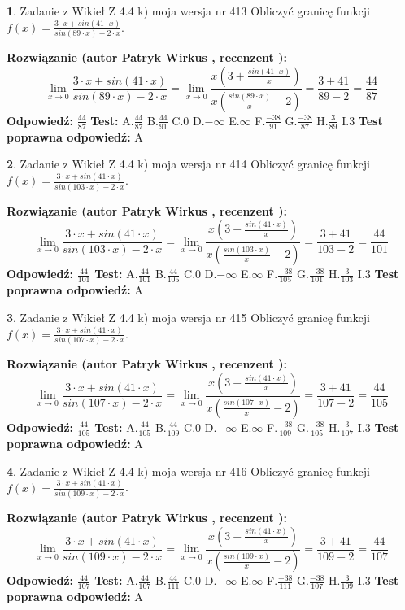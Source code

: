 \documentclass[12pt, a4paper]{article}
\theoremstyle{definition} %
\newtheorem{zad}{}
\newcommand{\zadStart}[1]{\begin{zad}#1\newline}
\newcommand{\zadStop}{\end{zad}}
\newcommand{\rozwStart}[2]{\noindent \textbf{Rozwiązanie (autor #1 , recenzent #2): }\newline}
\newcommand{\rozwStop}{\newline}
\newcommand{\odpStart}{\noindent \textbf{Odpowiedź:}\newline}
\newcommand{\odpStop}{\newline}
\newcommand{\testStart}{\noindent \textbf{Test:}\newline}
\newcommand{\testStop}{\newline}
\newcommand{\kluczStart}{\noindent \textbf{Test poprawna odpowiedź:}\newline}
\newcommand{\kluczStop}{\newline}
\begin{document}
\zadStart{Zadanie z Wikieł Z 4.4 k) moja wersja nr 413}
Obliczyć granicę funkcji $f(x)=\frac{3\cdot x +sin(41\cdot x)}{sin(89\cdot x) -2\cdot x}$.
\zadStop
\rozwStart{Patryk Wirkus}{}
$$\lim\limits_{x\to 0}\frac{3\cdot x +sin(41\cdot x)}{sin(89\cdot x) -2\cdot x}
=\lim\limits_{x\to 0}\frac{x(3+\frac{sin(41\cdot x)}{x})}{x(\frac{sin(89\cdot x)}{x}-2)}
=\frac{3+41}{89-2} = \frac{44}{87}$$
\rozwStop
\odpStart
$\frac{44}{87}$
\odpStop
\testStart
A.$\frac{44}{87}$
B.$\frac{44}{91}$
C.$0$
D.$-\infty$
E.$\infty$
F.$\frac{-38}{91}$
G.$\frac{-38}{87}$
H.$\frac{3}{89}$
I.$3$
\testStop
\kluczStart
A
\kluczStop



\zadStart{Zadanie z Wikieł Z 4.4 k) moja wersja nr 414}
Obliczyć granicę funkcji $f(x)=\frac{3\cdot x +sin(41\cdot x)}{sin(103\cdot x) -2\cdot x}$.
\zadStop
\rozwStart{Patryk Wirkus}{}
$$\lim\limits_{x\to 0}\frac{3\cdot x +sin(41\cdot x)}{sin(103\cdot x) -2\cdot x}
=\lim\limits_{x\to 0}\frac{x(3+\frac{sin(41\cdot x)}{x})}{x(\frac{sin(103\cdot x)}{x}-2)}
=\frac{3+41}{103-2} = \frac{44}{101}$$
\rozwStop
\odpStart
$\frac{44}{101}$
\odpStop
\testStart
A.$\frac{44}{101}$
B.$\frac{44}{105}$
C.$0$
D.$-\infty$
E.$\infty$
F.$\frac{-38}{105}$
G.$\frac{-38}{101}$
H.$\frac{3}{103}$
I.$3$
\testStop
\kluczStart
A
\kluczStop



\zadStart{Zadanie z Wikieł Z 4.4 k) moja wersja nr 415}
Obliczyć granicę funkcji $f(x)=\frac{3\cdot x +sin(41\cdot x)}{sin(107\cdot x) -2\cdot x}$.
\zadStop
\rozwStart{Patryk Wirkus}{}
$$\lim\limits_{x\to 0}\frac{3\cdot x +sin(41\cdot x)}{sin(107\cdot x) -2\cdot x}
=\lim\limits_{x\to 0}\frac{x(3+\frac{sin(41\cdot x)}{x})}{x(\frac{sin(107\cdot x)}{x}-2)}
=\frac{3+41}{107-2} = \frac{44}{105}$$
\rozwStop
\odpStart
$\frac{44}{105}$
\odpStop
\testStart
A.$\frac{44}{105}$
B.$\frac{44}{109}$
C.$0$
D.$-\infty$
E.$\infty$
F.$\frac{-38}{109}$
G.$\frac{-38}{105}$
H.$\frac{3}{107}$
I.$3$
\testStop
\kluczStart
A
\kluczStop



\zadStart{Zadanie z Wikieł Z 4.4 k) moja wersja nr 416}
Obliczyć granicę funkcji $f(x)=\frac{3\cdot x +sin(41\cdot x)}{sin(109\cdot x) -2\cdot x}$.
\zadStop
\rozwStart{Patryk Wirkus}{}
$$\lim\limits_{x\to 0}\frac{3\cdot x +sin(41\cdot x)}{sin(109\cdot x) -2\cdot x}
=\lim\limits_{x\to 0}\frac{x(3+\frac{sin(41\cdot x)}{x})}{x(\frac{sin(109\cdot x)}{x}-2)}
=\frac{3+41}{109-2} = \frac{44}{107}$$
\rozwStop
\odpStart
$\frac{44}{107}$
\odpStop
\testStart
A.$\frac{44}{107}$
B.$\frac{44}{111}$
C.$0$
D.$-\infty$
E.$\infty$
F.$\frac{-38}{111}$
G.$\frac{-38}{107}$
H.$\frac{3}{109}$
I.$3$
\testStop
\kluczStart
A
\kluczStop
\end{document}
